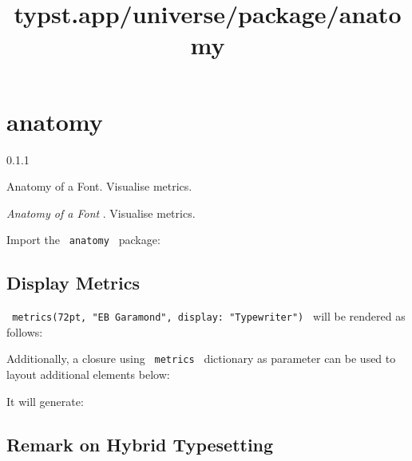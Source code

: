 \title{typst.app/universe/package/anatomy}

\label{banner}
\section{anatomy}\label{anatomy}

{ 0.1.1 }

Anatomy of a Font. Visualise metrics.

\label{readme}
\emph{Anatomy of a Font} . Visualise metrics.

Import the \texttt{\ anatomy\ } package:

\begin{Shaded}
\begin{Highlighting}[]
\end{Highlighting}
\end{Shaded}

\subsection{Display Metrics}\label{display-metrics}

\texttt{\ metrics(72pt,\ "EB\ Garamond",\ display:\ "Typewriter")\ }
will be rendered as follows:

\pandocbounded{}

Additionally, a closure using \texttt{\ metrics\ } dictionary as
parameter can be used to layout additional elements below:

\begin{Shaded}
\begin{Highlighting}[]
\NormalTok{  )}
\NormalTok{)}
\end{Highlighting}
\end{Shaded}

It will generate:

\pandocbounded{}

\subsection{Remark on Hybrid
Typesetting}\label{remark-on-hybrid-typesetting}

